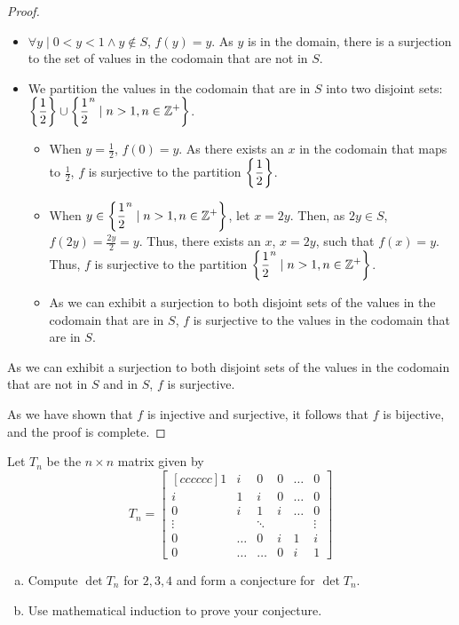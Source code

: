 \documentclass[11pt]{scrartcl}
\theoremstyle{dotlessP}
\theoremstyle{dotlessN}
\DeclarePairedDelimiter\set{\{}{\}}
\newcommand{\unite}{\cup}
\newcommand{\ints}{\mathbb{Z}}
\begin{document}
\begin{proof}
\begin{subproof}
		\begin{itemize}
			\item $\forall y \mid 0 < y < 1 \land y \not \in S$, $f(y) = y$. As $y $ is in the domain, there is a surjection to the set of values in the codomain that are not in $S$.
			\item We partition the values in the codomain that are in $S$ into two disjoint sets: $\set*{\displaystyle\frac{1}{2}} \unite \set*{\displaystyle\frac{1}{2}^n \mid n > 1, n \in \ints^+}$. 
			\begin{itemize}
			\item When $y = \displaystyle\frac{1}{2}$, $f(0) = y$. As there exists an $x$ in the codomain that maps to $\displaystyle\frac{1}{2}$, $f$ is surjective to the partition $\set*{\displaystyle\frac{1}{2}}$. 
			\item When $y \in \set*{\displaystyle\frac{1}{2}^n \mid n > 1, n \in \ints^+}$, let $x = 2y$. Then, as $2y \in S$, $f(2y) = \displaystyle\frac{2y}{2} = y$. Thus, there exists an $x$, $x = 2y$, such that $f(x) = y$. Thus, $f$ is surjective to the partition $\set*{\displaystyle\frac{1}{2}^n \mid n > 1, n \in \ints^+}$.
			\item As we can exhibit a surjection to both disjoint sets of the values in the codomain that are in $S$, $f$ is surjective to the values in the codomain that are in $S$.
			\end{itemize}
		\end{itemize}
			As we can exhibit a surjection to both disjoint sets of the values in the codomain that are not in $S$ and in $S$, $f$ is surjective.
	\end{subproof}
	As we have shown that $f$ is injective and surjective, it follows that $f$ is bijective, and the proof is complete.
\end{proof}
\begin{ques}
	Let $T_n$ be the $n\times n$ matrix given by
	\[
	T_n = 
	\begin{bmatrix}[cccccc]
		1 & i & 0 & 0 & \dots & 0 \\
		i & 1 & i & 0 & \dots & 0 \\
		0 & i & 1 & i & \dots & 0 \\
		\vdots & & \ddots & & & \vdots \\
		0 & \dots & 0 & i & 1 & i \\
		0 & \dots & \dots & 0 & i & 1

	\end{bmatrix}
	\] 
	\begin{enumerate}[(a)]
	\item Compute $\det T_n$ for $2,3,4$ and form a conjecture for $\det T_n$.
	\item Use mathematical induction to prove your conjecture.
	\end{enumerate}
\end{ques}
\end{document}
